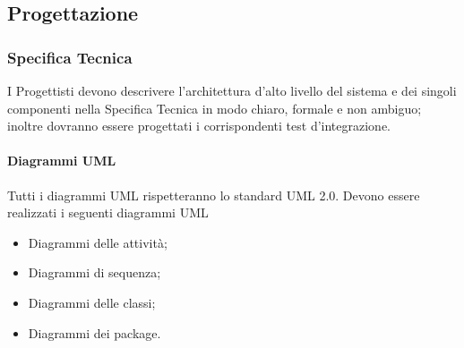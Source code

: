 \subsection{Progettazione}
\label{}
\subsubsection{Specifica Tecnica}
\label{}
I Progettisti devono descrivere l'architettura d'alto livello del sistema e dei singoli componenti nella Specifica Tecnica in modo chiaro, formale e non ambiguo; inoltre dovranno essere progettati i corrispondenti test d'integrazione.

\paragraph{Diagrammi UML \\}
\label{}
Tutti i diagrammi UML rispetteranno lo standard UML 2.0.
Devono essere realizzati i seguenti diagrammi UML
\begin{itemize}
\item Diagrammi delle attività;
\item Diagrammi di sequenza;
\item Diagrammi delle classi;
\item Diagrammi dei package.
\end{itemize}

